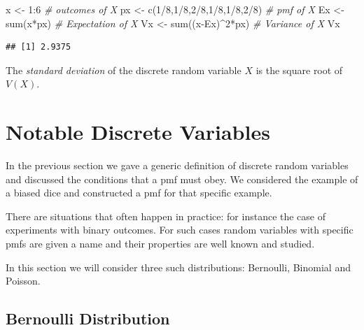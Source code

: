 \documentclass[
]{book}
\newenvironment{Shaded}{\begin{snugshade}}{\end{snugshade}}
\newcommand{\CommentTok}[1]{\textcolor[rgb]{0.56,0.35,0.01}{\textit{#1}}}
\newcommand{\DecValTok}[1]{\textcolor[rgb]{0.00,0.00,0.81}{#1}}
\newcommand{\FunctionTok}[1]{\textcolor[rgb]{0.00,0.00,0.00}{#1}}
\newcommand{\NormalTok}[1]{#1}
\newcommand{\OtherTok}[1]{\textcolor[rgb]{0.56,0.35,0.01}{#1}}
\newcommand{\SpecialCharTok}[1]{\textcolor[rgb]{0.00,0.00,0.00}{#1}}
\begin{document}
\begin{Shaded}
\begin{Highlighting}[]
\NormalTok{x }\OtherTok{\textless{}{-}} \DecValTok{1}\SpecialCharTok{:}\DecValTok{6}  \CommentTok{\# outcomes of X}
\NormalTok{px }\OtherTok{\textless{}{-}} \FunctionTok{c}\NormalTok{(}\DecValTok{1}\SpecialCharTok{/}\DecValTok{8}\NormalTok{,}\DecValTok{1}\SpecialCharTok{/}\DecValTok{8}\NormalTok{,}\DecValTok{2}\SpecialCharTok{/}\DecValTok{8}\NormalTok{,}\DecValTok{1}\SpecialCharTok{/}\DecValTok{8}\NormalTok{,}\DecValTok{1}\SpecialCharTok{/}\DecValTok{8}\NormalTok{,}\DecValTok{2}\SpecialCharTok{/}\DecValTok{8}\NormalTok{)  }\CommentTok{\# pmf of X}
\NormalTok{Ex }\OtherTok{\textless{}{-}} \FunctionTok{sum}\NormalTok{(x}\SpecialCharTok{*}\NormalTok{px)  }\CommentTok{\# Expectation of X}
\NormalTok{Vx }\OtherTok{\textless{}{-}} \FunctionTok{sum}\NormalTok{((x}\SpecialCharTok{{-}}\NormalTok{Ex)}\SpecialCharTok{\^{}}\DecValTok{2}\SpecialCharTok{*}\NormalTok{px)  }\CommentTok{\# Variance of X}
\NormalTok{Vx}
\end{Highlighting}
\end{Shaded}

\begin{verbatim}
## [1] 2.9375
\end{verbatim}

The \emph{standard deviation} of the discrete random variable \(X\) is the square root of \(V(X)\).

\hypertarget{notable-discrete-variables}{%
\section{Notable Discrete Variables}\label{notable-discrete-variables}}

In the previous section we gave a generic definition of discrete random variables and discussed the conditions that a pmf must obey. We considered the example of a biased dice and constructed a pmf for that specific example.

There are situations that often happen in practice: for instance the case of experiments with binary outcomes. For such cases random variables with specific pmfs are given a name and their properties are well known and studied.

In this section we will consider three such distributions: Bernoulli, Binomial and Poisson.

\hypertarget{bernoulli-distribution}{%
\subsection{Bernoulli Distribution}\label{bernoulli-distribution}}
\end{document}
